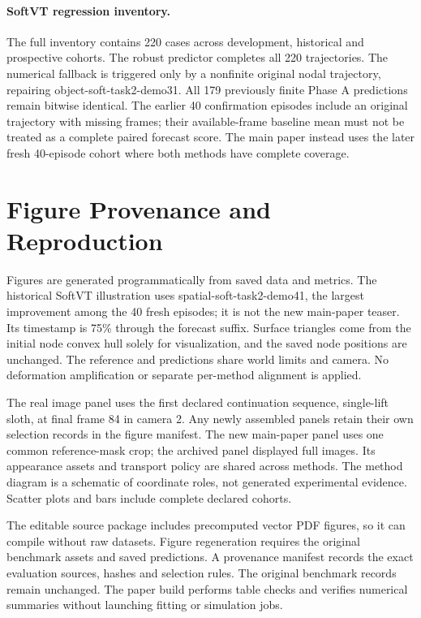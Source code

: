 \documentclass[10pt,twocolumn,letterpaper]{article}
\begin{document}
\paragraph{SoftVT regression inventory.}
The full inventory contains 220 cases across development, historical and prospective cohorts. The robust predictor completes all 220 trajectories. The numerical fallback is triggered only by a nonfinite original nodal trajectory, repairing object-soft-task2-demo31. All 179 previously finite Phase A predictions remain bitwise identical. The earlier 40 confirmation episodes include an original trajectory with missing frames; their available-frame baseline mean must not be treated as a complete paired forecast score. The main paper instead uses the later fresh 40-episode cohort where both methods have complete coverage.

\section{Figure Provenance and Reproduction}
Figures are generated programmatically from saved data and metrics. The historical SoftVT illustration uses spatial-soft-task2-demo41, the largest improvement among the 40 fresh episodes; it is not the new main-paper teaser. Its timestamp is 75\% through the forecast suffix. Surface triangles come from the initial node convex hull solely for visualization, and the saved node positions are unchanged. The reference and predictions share world limits and camera. No deformation amplification or separate per-method alignment is applied.

The real image panel uses the first declared continuation sequence, single-lift sloth, at final frame 84 in camera 2. Any newly assembled panels retain their own selection records in the figure manifest. The new main-paper panel uses one common reference-mask crop; the archived panel displayed full images. Its appearance assets and transport policy are shared across methods. The method diagram is a schematic of coordinate roles, not generated experimental evidence. Scatter plots and bars include complete declared cohorts.

The editable source package includes precomputed vector PDF figures, so it can compile without raw datasets. Figure regeneration requires the original benchmark assets and saved predictions. A provenance manifest records the exact evaluation sources, hashes and selection rules. The original benchmark records remain unchanged. The paper build performs table checks and verifies numerical summaries without launching fitting or simulation jobs.
\end{document}

